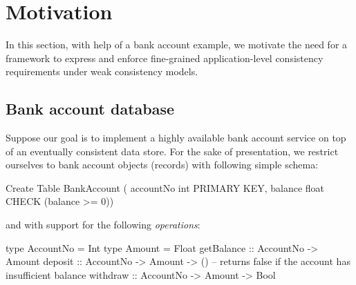 \section{Motivation}
\label{sec:motivation}

In this section, with help of a bank account example, we motivate the
need for a framework to express and enforce fine-grained
application-level consistency requirements under weak consistency
models. 


\subsection{Bank account database}

Suppose our goal is to implement a highly available bank account
service on top of an eventually consistent data store. For the sake of
presentation, we restrict ourselves to bank account objects (records)
with following simple schema:

\begin{codesql}
Create Table BankAccount (
  accountNo int PRIMARY KEY,
  balance float CHECK (balance >= 0))
\end{codesql}

\noindent and with support for the following \emph{operations}:

\begin{codehaskell}
type AccountNo = Int
type Amount = Float
getBalance :: AccountNo -> Amount
deposit    :: AccountNo -> Amount -> ()
-- returns false if the account has insufficient balance
withdraw   :: AccountNo -> Amount -> Bool
\end{codehaskell}

